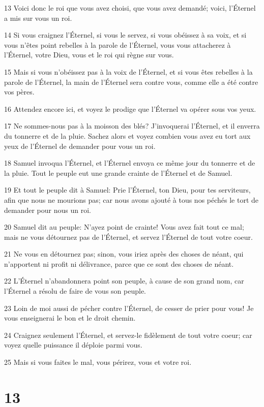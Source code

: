 \par 13 Voici donc le roi que vous avez choisi, que vous avez demandé; voici, l'Éternel a mis sur vous un roi.
\par 14 Si vous craignez l'Éternel, si vous le servez, si vous obéissez à sa voix, et si vous n'êtes point rebelles à la parole de l'Éternel, vous vous attacherez à l'Éternel, votre Dieu, vous et le roi qui règne sur vous.
\par 15 Mais si vous n'obéissez pas à la voix de l'Éternel, et si vous êtes rebelles à la parole de l'Éternel, la main de l'Éternel sera contre vous, comme elle a été contre vos pères.
\par 16 Attendez encore ici, et voyez le prodige que l'Éternel va opérer sous vos yeux.
\par 17 Ne sommes-nous pas à la moisson des blés? J'invoquerai l'Éternel, et il enverra du tonnerre et de la pluie. Sachez alors et voyez combien vous avez eu tort aux yeux de l'Éternel de demander pour vous un roi.
\par 18 Samuel invoqua l'Éternel, et l'Éternel envoya ce même jour du tonnerre et de la pluie. Tout le peuple eut une grande crainte de l'Éternel et de Samuel.
\par 19 Et tout le peuple dit à Samuel: Prie l'Éternel, ton Dieu, pour tes serviteurs, afin que nous ne mourions pas; car nous avons ajouté à tous nos péchés le tort de demander pour nous un roi.
\par 20 Samuel dit au peuple: N'ayez point de crainte! Vous avez fait tout ce mal; mais ne vous détournez pas de l'Éternel, et servez l'Éternel de tout votre coeur.
\par 21 Ne vous en détournez pas; sinon, vous iriez après des choses de néant, qui n'apportent ni profit ni délivrance, parce que ce sont des choses de néant.
\par 22 L'Éternel n'abandonnera point son peuple, à cause de son grand nom, car l'Éternel a résolu de faire de vous son peuple.
\par 23 Loin de moi aussi de pécher contre l'Éternel, de cesser de prier pour vous! Je vous enseignerai le bon et le droit chemin.
\par 24 Craignez seulement l'Éternel, et servez-le fidèlement de tout votre coeur; car voyez quelle puissance il déploie parmi vous.
\par 25 Mais si vous faites le mal, vous périrez, vous et votre roi.

\chapter{13}


